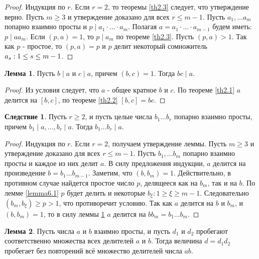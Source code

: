 \documentclass[a4paper, 12pt]{article}
\renewcommand{\div}{\mid}
\theoremstyle{definition}
\newtheorem*{consequense}{Следствие}
\newtheorem{lemma}{Лемма}[section]
\begin{document}
    \begin{proof}
        Индукция по $r$. Если $r=2$, то  теоремы \ref{th2.3} следует, что утверждение верно. Пусть $m\geq 3$ и утверждение доказано для всех $r\leq m-1$. Пусть $a_1,\dots a_m$ попарно взаимно просты и $p \div a_1\cdot...\cdot a_m$. Полагая $a=a_1\cdot ... \cdot a_{m-1}$ будем иметь: $p \div aa_m$. Если $(p,a)=1$, то $p\div a_m$ по теореме \ref{th2.3}. Пусть $(p,a)>1$. Так как $p$ - простое, то $(p,a)=p$ и $p$ делит некоторый сомножитель $a_{s}:\\ 1 \leq s \leq m-1$.
    \end{proof} 
    \begin{lemma} \label{lemma6.2}
        Пусть $b\div a$ и $c\div a$, причем $(b,c)=1$. Тогда $bc\div a$.
    \end{lemma}
    \begin{proof}
        Из условия следует, что $a$ - общее кратное $b$ и $c$. По теореме \ref{th2.1} $a$ делится на $[b,c]$, по теореме \ref{th2.2} $[b,c]=bc$.
    \end{proof}
    \begin{consequense}
        Пусть $r\geq 2$, и пусть целые числа $b_1\dots b_r$ попарно взаимно просты, причем $b_1 \div a, \dots, b_r \div a$. Тогда $b_1\dots b_r \div a$.
    \end{consequense} 
    \begin{proof}
        Индукция по $r$. Если $r=2$, получаем утверждение леммы. Пусть $m\geq 3$ и утверждение доказано для всех $r\leq m-1$. Пусть $b_1, \dots b_m$ попарно взаимно просты и каждое из них делит $a$. В силу предложения индукции, $a$ делится на произведение $b = b_1\dots b_{m-1}$. Заметим, что $(b,b_m)=1$. Действительно, в противном случае найдется простое число $p$, делящееся как на $b_m$, так и на $b$. По лемме \ref{lemma6.1} $p$ будет делить и некоторые $b_{\xi}: 1\geq \xi \geq m-1$. Следовательно $(b_m,b_{\xi})\geq p>1$, что противоречит условию. Так как $a$ делится на $b$ и $b_m$, и $(b, b_m)=1$, то в силу леммы \ref{lemma6.2} $a$ делится на $bb_m=b_1\dots b_m$.
    \end{proof}
    \begin{lemma} \label{lemma6.3}
        Пусть числа $a$ и $b$ взаимно просты, и пусть $d_1$ и $d_2$ пробегают соответственно множества всех делителей $a$ и $b$. Тогда величина $d=d_1d_2$ пробегает без повторений всё множество делителей числа $ab$.
    \end{lemma} 
\end{document}
